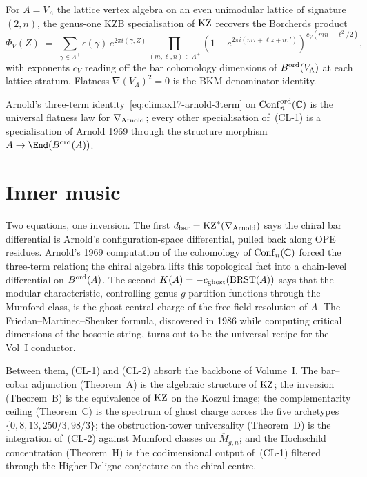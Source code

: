 \begin{corollary}[Borcherds]
\label{cor:climax17-borcherds}
\ClaimStatusProvedHere
For $A=V_\Lambda$ the lattice vertex algebra on an even unimodular
lattice of signature $(2,n)$, the genus-one KZB specialisation of
$\mathrm{KZ}$ recovers the Borcherds product
\[
  \Phi_V(Z)\;=\;\sum_{\gamma\in\Lambda^+}\epsilon(\gamma)\,
    e^{2\pi i(\gamma,Z)}
    \prod_{(m,\ell,n)\in\Lambda^+}
    (1-e^{2\pi i(m\tau+\ell z+n\tau')})^{c_V(mn-\ell^2/2)},
\]
with exponents $c_V$ reading off the bar cohomology dimensions of
$B^{\mathrm{ord}}(V_\Lambda)$ at each lattice stratum. Flatness
$\nabla(V_\Lambda)^2=0$ is the BKM denominator identity.
\end{corollary}

\begin{corollary}
\label{cor:climax17-arnold-generator}
\ClaimStatusProvedHere
Arnold's three-term identity~\eqref{eq:climax17-arnold-3term} on
$\operatorname{Conf}_n^{\mathrm{ord}}(\mathbb{C})$ is the universal flatness law for
$\nabla_{\mathrm{Arnold}}$; every other specialisation of~\textup{(CL-1)} is a
specialisation of Arnold 1969 through the structure morphism
$A\to\End(\Bord(A))$.
\end{corollary}

\section{Inner music}
\label{sec:climax17-inner-music}

Two equations, one inversion. The first $d_{\mathrm{bar}}=\mathrm{KZ}^*(\nabla_{\mathrm{Arnold}})$ says the
chiral bar differential is Arnold's configuration-space differential,
pulled back along OPE residues. Arnold's 1969 computation of the
cohomology of $\operatorname{Conf}_n(\mathbb{C})$ forced the three-term relation;
the chiral algebra lifts this topological fact into a chain-level
differential on $B^{\mathrm{ord}}(A)$. The second $K(A)=-c_{\mathrm{ghost}}(\mathrm{BRST}(A))$ says
that the modular characteristic, controlling genus-$g$ partition
functions through the Mumford class, is the ghost central charge of
the free-field resolution of $A$. The Friedan--Martinec--Shenker
formula, discovered in 1986 while computing critical dimensions of
the bosonic string, turns out to be the universal recipe for the
Vol~I conductor.

Between them, \textup{(CL-1)} and \textup{(CL-2)} absorb the backbone
of Volume~I. The bar--cobar adjunction (Theorem~A) is the algebraic
structure of $\mathrm{KZ}$; the inversion (Theorem~B) is the equivalence of
$\mathrm{KZ}$ on the Koszul image; the complementarity ceiling (Theorem~C) is
the spectrum of ghost charge across the five archetypes
$\{0,8,13,250/3,98/3\}$; the obstruction-tower universality
(Theorem~D) is the integration of~\textup{(CL-2)} against Mumford
classes on $\overline{M}_{g,n}$; and the Hochschild concentration
(Theorem~H) is the codimensional output of~\textup{(CL-1)} filtered
through the Higher Deligne conjecture on the chiral centre.


